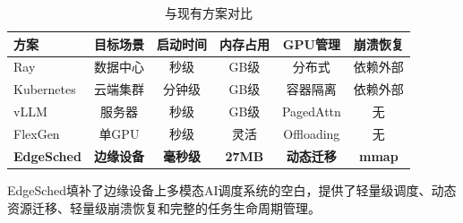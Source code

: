\begin{table}[htbp]
\caption{与现有方案对比}
\label{tab:comparison}
\centering
\scriptsize
\begin{tabular}{@{}lccccc@{}}
\toprule
方案 & 目标场景 & 启动时间 & 内存占用 & GPU管理 & 崩溃恢复 \\
\midrule
Ray & 数据中心 & 秒级 & GB级 & 分布式 & 依赖外部 \\
Kubernetes & 云端集群 & 分钟级 & GB级 & 容器隔离 & 依赖外部 \\
vLLM & 服务器 & 秒级 & GB级 & PagedAttn & 无 \\
FlexGen & 单GPU & 秒级 & 灵活 & Offloading & 无 \\
\textbf{EdgeSched} & \textbf{边缘设备} & \textbf{毫秒级} & \textbf{27MB} & \textbf{动态迁移} & \textbf{mmap} \\
\bottomrule
\end{tabular}
\end{table}

EdgeSched填补了边缘设备上多模态AI调度系统的空白，提供了轻量级调度、动态资源迁移、轻量级崩溃恢复和完整的任务生命周期管理。
